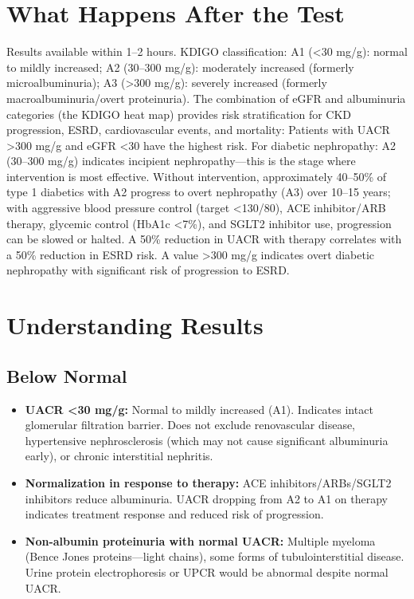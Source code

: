 \section*{What Happens After the Test}
Results available within 1--2 hours. KDIGO classification: A1 (<30 mg/g): normal to mildly increased; A2 (30--300 mg/g): moderately increased (formerly microalbuminuria); A3 (>300 mg/g): severely increased (formerly macroalbuminuria/overt proteinuria). The combination of eGFR and albuminuria categories (the KDIGO heat map) provides risk stratification for CKD progression, ESRD, cardiovascular events, and mortality: Patients with UACR >300 mg/g and eGFR <30 have the highest risk. For diabetic nephropathy: A2 (30--300 mg/g) indicates incipient nephropathy---this is the stage where intervention is most effective. Without intervention, approximately 40--50\% of type 1 diabetics with A2 progress to overt nephropathy (A3) over 10--15 years; with aggressive blood pressure control (target <130/80), ACE inhibitor/ARB therapy, glycemic control (HbA1c <7\%), and SGLT2 inhibitor use, progression can be slowed or halted. A 50\% reduction in UACR with therapy correlates with a 50\% reduction in ESRD risk. A value >300 mg/g indicates overt diabetic nephropathy with significant risk of progression to ESRD.

\section*{Understanding Results}

\subsection*{Below Normal}
\begin{itemize}
  \item \textbf{UACR <30 mg/g:} Normal to mildly increased (A1). Indicates intact glomerular filtration barrier. Does not exclude renovascular disease, hypertensive nephrosclerosis (which may not cause significant albuminuria early), or chronic interstitial nephritis.
  \item \textbf{Normalization in response to therapy:} ACE inhibitors/ARBs/SGLT2 inhibitors reduce albuminuria. UACR dropping from A2 to A1 on therapy indicates treatment response and reduced risk of progression.
  \item \textbf{Non-albumin proteinuria with normal UACR:} Multiple myeloma (Bence Jones proteins---light chains), some forms of tubulointerstitial disease. Urine protein electrophoresis or UPCR would be abnormal despite normal UACR.
\end{itemize}

